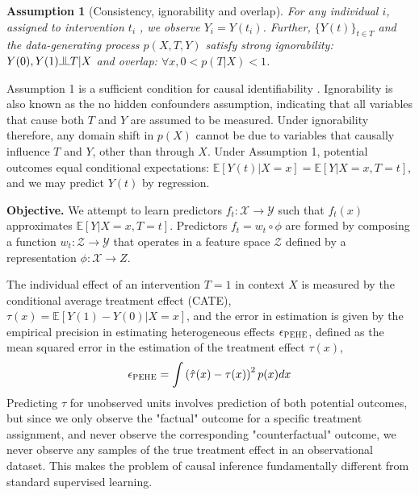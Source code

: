 \documentclass[twoside]{article}
\newcommand{\indep}{\raisebox{0.08em}{\rotatebox[origin=c]{90}{$\models$}}}
\begin{document}
\textbf{Assumption 1} (Consistency, ignorability and overlap). \textit{For any individual $i$, assigned to intervention $t_i$ , we observe $Y_i = Y(t_i)$. Further, $\{Y (t)\}_{t\in T}$ and the data-generating process $p(X, T, Y )$ satisfy strong ignorability: $Y(0),Y(1) \indep T | X$ and overlap: $\forall x, 0 < p(T | X) < 1$.}

Assumption 1 is a sufficient condition for causal identifiability \cite{rubin2005causal}. Ignorability is also known as the no hidden confounders assumption, indicating that all variables that cause both $T$ and $Y$ are assumed to be measured. Under ignorability therefore, any domain shift in $p(X)$ cannot be due to variables that causally influence $T$ and $Y$, other than through $X$. Under Assumption 1, potential outcomes equal conditional expectations: $\mathbb{E}[Y (t) | X = x] = \mathbb{E}[Y | X = x, T = t]$, and we may predict $Y (t)$ by regression. 

\textbf{Objective.} We attempt to learn predictors $f_t:\mathcal X \rightarrow \mathcal Y$ such that $f_t(x)$ approximates $\mathbb E[Y | X = x, T = t]$. Predictors $f_t = w_t \circ \phi$ are formed by composing a function $w_t:\mathcal Z \rightarrow \mathcal Y$ that operates in a feature space $\mathcal Z$ defined by a representation $\phi:\mathcal X \rightarrow Z$.

The individual effect of an intervention $T = 1$ in context $X$ is measured by the conditional average treatment effect (CATE), $\tau(x) = \mathbb E [Y (1) - Y (0) | X = x]$, and the error in estimation is given by the empirical precision in estimating heterogeneous effects $\epsilon_{\textsc{PEHE}}$, defined as the mean squared error in the estimation of the treatment effect $\tau(x)$,
\begin{align}
\label{pehe}
    \epsilon_{\textsc{PEHE}}= \int \left(\hat \tau(x) - \tau(x)\right)^2 p(x) dx
\end{align}
Predicting $\tau$ for unobserved units involves prediction of both potential outcomes, but since we only observe the "factual" outcome for a specific treatment assignment, and never observe the corresponding "counterfactual" outcome, we never observe any samples of the true treatment effect in an observational dataset. This makes the problem of causal inference fundamentally different from standard supervised learning. 
\end{document}
